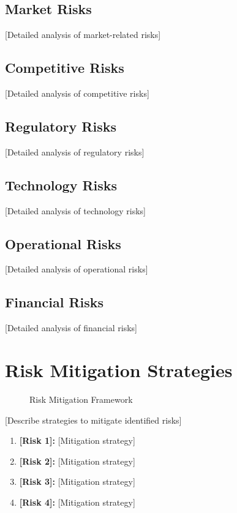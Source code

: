 \documentclass[11pt,letterpaper]{report}
\begin{document}
\subsection{Market Risks}
[Detailed analysis of market-related risks]

\subsection{Competitive Risks}
[Detailed analysis of competitive risks]

\subsection{Regulatory Risks}
[Detailed analysis of regulatory risks]

\subsection{Technology Risks}
[Detailed analysis of technology risks]

\subsection{Operational Risks}
[Detailed analysis of operational risks]

\subsection{Financial Risks}
[Detailed analysis of financial risks]

\section{Risk Mitigation Strategies}


\begin{figure}[htbp]
\centering
\caption{Risk Mitigation Framework}
\label{fig:risk_mitigation}
\end{figure}

[Describe strategies to mitigate identified risks]

\begin{riskbox}
\begin{enumerate}
    \item \textbf{[Risk 1]:} [Mitigation strategy]
    \item \textbf{[Risk 2]:} [Mitigation strategy]
    \item \textbf{[Risk 3]:} [Mitigation strategy]
    \item \textbf{[Risk 4]:} [Mitigation strategy]
\end{enumerate}
\end{riskbox}
\end{document}
